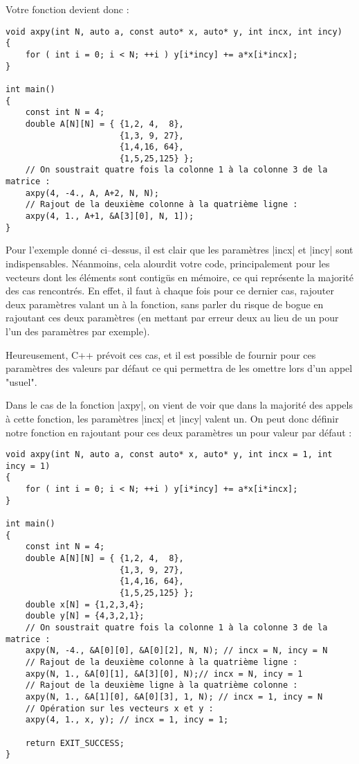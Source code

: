 Votre fonction devient donc :
\begin{lstlisting}[caption=Généralisation de la fonction axpy]
void axpy(int N, auto a, const auto* x, auto* y, int incx, int incy)
{
    for ( int i = 0; i < N; ++i ) y[i*incy] += a*x[i*incx];
}

int main()
{
    const int N = 4;
    double A[N][N] = { {1,2, 4,  8}, 
                       {1,3, 9, 27},
                       {1,4,16, 64},
                       {1,5,25,125} };
    // On soustrait quatre fois la colonne 1 à la colonne 3 de la matrice :
    axpy(4, -4., A, A+2, N, N);
    // Rajout de la deuxième colonne à la quatrième ligne :
    axpy(4, 1., A+1, &A[3][0], N, 1]);
}
\end{lstlisting}

Pour l'exemple donné ci--dessus, il est clair que les paramètres |incx| et |incy| sont indispensables. 
Néanmoins, cela alourdit votre code, principalement pour les vecteurs dont les éléments sont contigüs en mémoire, ce qui représente la majorité des cas rencontrés. En effet, 
il faut à chaque fois pour ce dernier cas, rajouter deux paramètres valant un à la fonction, sans parler du risque de bogue en rajoutant ces deux paramètres (en mettant par erreur deux au lieu de un pour l'un des paramètres par exemple).

Heureusement, C++ prévoit ces cas, et il est possible de fournir pour ces paramètres des valeurs par défaut ce qui permettra de les omettre lors d'un appel "usuel".

Dans le cas de la fonction |axpy|, on vient de voir que dans la majorité des appels à cette fonction, les paramètres |incx| et |incy| valent un. On peut donc définir notre fonction en rajoutant pour ces deux paramètres un pour valeur par défaut :
\begin{lstlisting}[caption=Valeurs par défaut pour la fonction axpy]
void axpy(int N, auto a, const auto* x, auto* y, int incx = 1, int incy = 1)
{
    for ( int i = 0; i < N; ++i ) y[i*incy] += a*x[i*incx];
}

int main()
{
    const int N = 4;
    double A[N][N] = { {1,2, 4,  8}, 
                       {1,3, 9, 27},
                       {1,4,16, 64},
                       {1,5,25,125} };
    double x[N] = {1,2,3,4};
    double y[N] = {4,3,2,1};
    // On soustrait quatre fois la colonne 1 à la colonne 3 de la matrice :
    axpy(N, -4., &A[0][0], &A[0][2], N, N); // incx = N, incy = N
    // Rajout de la deuxième colonne à la quatrième ligne :
    axpy(N, 1., &A[0][1], &A[3][0], N);// incx = N, incy = 1
    // Rajout de la deuxième ligne à la quatrième colonne :
    axpy(N, 1., &A[1][0], &A[0][3], 1, N); // incx = 1, incy = N
    // Opération sur les vecteurs x et y :
    axpy(4, 1., x, y); // incx = 1, incy = 1;

    return EXIT_SUCCESS;
}
\end{lstlisting}

